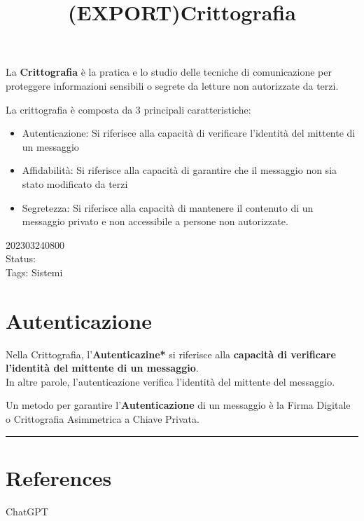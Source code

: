 \documentclass[
]{article}
\title{(EXPORT)Crittografia}
\author{}
\date{}
\providecommand{\tightlist}{%
  \setlength{\itemsep}{0pt}\setlength{\parskip}{0pt}}
\begin{document}
\maketitle

La \textbf{Crittografia} è la pratica e lo studio delle tecniche di
comunicazione per proteggere informazioni sensibili o segrete da letture
non autorizzate da terzi.

La crittografia è composta da 3 principali caratteristiche:

\begin{itemize}
\tightlist
\item
  Autenticazione: Si riferisce alla capacità di verificare l'identità
  del mittente di un messaggio
\item
  Affidabilità: Si riferisce alla capacità di garantire che il messaggio
  non sia stato modificato da terzi
\item
  Segretezza: Si riferisce alla capacità di mantenere il contenuto di un
  messaggio privato e non accessibile a persone non autorizzate.
\end{itemize}

202303240800\\
Status:\\
Tags: Sistemi

\hypertarget{autenticazione}{%
\section{Autenticazione}\label{autenticazione}}

Nella Crittografia, l'\textbf{Autenticazine*} si riferisce alla
\textbf{capacità di verificare l'identità del mittente di un
messaggio}.\\
In altre parole, l'autenticazione verifica l'identità del mittente del
messaggio.

Un metodo per garantire l'\textbf{Autenticazione} di un messaggio è la
Firma Digitale o Crittografia Asimmetrica a Chiave Privata.

\begin{center}\rule{0.5\linewidth}{0.5pt}\end{center}

\hypertarget{references}{%
\section{References}\label{references}}

ChatGPT

\hfill\break
\end{document}
